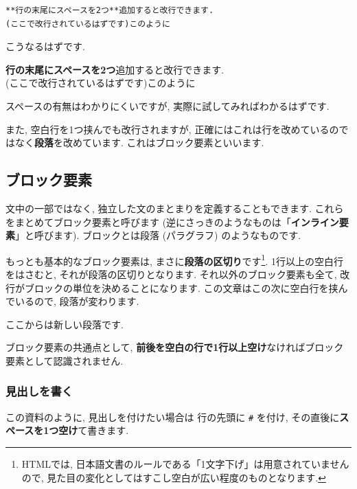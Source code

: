 \documentclass[
]{ltjsarticle}
\newenvironment{infobox}[1]{\begin{itemize}\renewcommand{\labelitemi}{\raisebox{-.7\height}[0pt][0pt]{%
  {\setkeys{Gin}{width=3em,keepaspectratio}\texttt{[image: \_latex/\_img/\#1]}}}}
  \setlength{\fboxsep}{1em}
  \begin{greyblock}
  \item
  }{\end{greyblock}\end{itemize}
}
\begin{document}
\begin{verbatim}
**行の末尾にスペースを2つ**追加すると改行できます.  
(ここで改行されているはずです)このように
\end{verbatim}

こうなるはずです.

\textbf{行の末尾にスペースを2つ}追加すると改行できます.\\
(ここで改行されているはずです)このように

スペースの有無はわかりにくいですが, 実際に試してみればわかるはずです.

また, 空白行を1つ挟んでも改行されますが, 正確にはこれは行を改めているのではなく\textbf{段落}を改めています. これはブロック要素といいます.

\hypertarget{ux30d6ux30edux30c3ux30afux8981ux7d20}{%
\subsection{ブロック要素}\label{ux30d6ux30edux30c3ux30afux8981ux7d20}}

文中の一部ではなく, 独立した文のまとまりを定義することもできます. これらをまとめてブロック要素と呼びます (逆にさっきのようなものは「\textbf{インライン要素}」と呼びます). ブロックとは段落 (パラグラフ) のようなものです.

もっとも基本的なブロック要素は, まさに\textbf{段落の区切り}です\footnote{HTMLでは, 日本語文書のルールである「1文字下げ」は用意されていませんので, 見た目の変化としてはすこし空白が広い程度のものとなります.}. 1行以上の空白行をはさむと, それが段落の区切りとなります. それ以外のブロック要素も全て, 改行がブロックの単位を決めることになります. この文章はこの次に空白行を挟んでいるので, 段落が変わります.

ここからは新しい段落です.

\begin{infobox}{important}
ブロック要素の共通点として, \textbf{前後を空白の行で1行以上空け}なければブロック要素として認識されません.

\end{infobox}

\hypertarget{ux898bux51faux3057ux3092ux66f8ux304f}{%
\subsubsection{見出しを書く}\label{ux898bux51faux3057ux3092ux66f8ux304f}}

この資料のように, 見出しを付けたい場合は 行の先頭に \texttt{\#} を付け, その直後に\textbf{スペースを1つ空け}て書きます.
\end{document}
